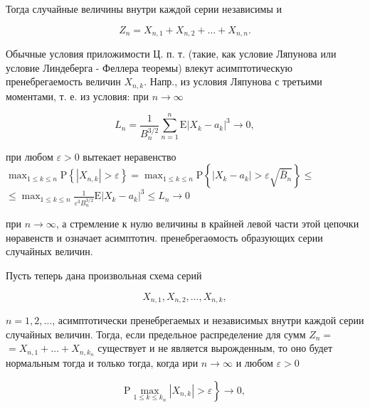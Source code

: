 \documentclass[10pt]{article}
\begin{document}
Тогда случайные величины внутри каждой серии независимы и



\[

Z_{n}=X_{n, 1}+X_{n, 2}+\ldots+X_{n, n} .

\]



Обычные условия приложимости Ц. п. т. (такие, как условие Ляпунова или условие Линдеберга - Феллера теоремы) влекут асимптотическую пренебрегаемость величин $X_{n, k}$. Напр., из условия Ляпунова с третьими моментами, т. е. из условия: при $n \rightarrow \infty$



\[

L_{n}=\frac{1}{B_{n}^{3 / 2}} \sum_{n=1}^{n} \mathrm{E}\left|X_{k}-a_{k}\right|^{3} \rightarrow 0,

\]



при любом $\varepsilon>0$ вытекает неравенство $\max _{1 \leqslant k \leqslant n} \mathrm{P}\left\{\left|X_{n, k}\right|>\varepsilon\right\}=\max _{1 \leqslant k \leqslant n} \mathrm{P}\left\{\left|X_{k}-a_{k}\right|>\varepsilon \sqrt{\bar{B}_{n}}\right\} \leqslant$ $\leqslant \max _{1 \leqslant k \leqslant n} \frac{1}{\varepsilon^{3} B_{n}^{3 / 2}} \mathrm{E}\left|X_{k}-a_{k}\right|^{3} \leqslant L_{n} \rightarrow 0$



при $n \rightarrow \infty$, а стремление к нулю величины в крайней левой части этой цепочки нөравенств и означает асимптотич. пренебрегаөмость образующих серии случайных величин.



Пусть теперь дана произвольная схема серий



\[

X_{n, 1}, X_{n, 2}, \ldots, X_{n, k},

\]



$n=1,2, \ldots$, асимптотически пренебрегаемых и независимых внутри каждой серии случайных величин. Тогда, если предельное распределение для сумм $Z_{n}=$ $=X_{n, 1}+\ldots+X_{n, k_{n}}$ существует и не является вырожденным, то оно будет нормальным тогда и только тогда, когда ири $n \longrightarrow \infty$ и любом $\varepsilon>0$



\[

\left.\mathrm{P} \max _{1 \leqslant k \leqslant k_{n}}\left|X_{n, k}\right|>\varepsilon\right\} \rightarrow 0,

\]
\end{document}
